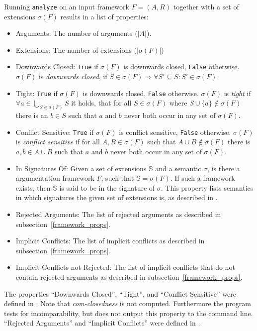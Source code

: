 \documentclass{scrartcl}
\begin{document}
Running \texttt{analyze} on an input framework $F=(A,R)$ together with a set of
extensions $\sigma(F)$ results in a list of properties:
\begin{itemize}
  \item Arguments: The number of arguments ($|A|$).
  \item Extensions:	The number of extensions ($|\sigma(F)|$)
  \item Downwards Closed:	\texttt{True} if $\sigma(F)$ is downwards closed, \texttt{False} otherwise.
    $\sigma(F)$ is \emph{downwards closed}, if $S \in \sigma(F)\Rightarrow
    \forall S'\subseteq S: S'\in\sigma(F)$.
  \item Tight: \texttt{True} if $\sigma(F)$ is downwards closed, \texttt{False} otherwise.
    $\sigma(F)$ is \emph{tight} if $\forall a\in\bigcup_{S\in\sigma(F)}S$ it holds, that
    for all $S\in\sigma(F)$ where $S\cup\{a\}\notin\sigma(F)$ there is an $b\in S$ such that $a$ and $b$
    never both occur in any set of $\sigma(F)$.
  \item Conflict Sensitive: \texttt{True} if $\sigma(F)$ is conflict sensitive, \texttt{False} otherwise.
    $\sigma(F)$ is \emph{conflict sensitive} if for all $A, B\in\sigma(F)$ such that $A\cup B\notin\sigma(F)$
    there is $a, b\in A\cup B$ such that $a$ and $b$ never both occur in any set of $\sigma(F)$.
  \item In Signatures Of: Given a set of extensions $\mathbb{S}$ and a semantic $\sigma$, is there a
    argumentation framework $F$, such that $\mathbb{S} = \sigma(F)$. If such a framework exists,
    then $\mathbb{S}$ is said to be in the signature of $\sigma$. This property lists semantics in which signatures
    the given set of extensions is, as described in \cite{dunne2015characteristics}.
  \item Rejected Arguments: The list of rejected arguments as described in subsection~\ref{framework_props}.
  \item Implicit Conflicts: The list of implicit conflicts as described in subsection~\ref{framework_props}.
  \item Implicit Conflicts not Rejected: The list of implicit conflicts that do not contain rejected arguments
    as described in subsection~\ref{framework_props}.
\end{itemize}

The properties ``Downwards Closed'', ``Tight'', and ``Conflict Sensitive'' were defined
in \cite{dunne2015characteristics}. Note that \emph{com-closedness} is not computed. Furthermore
the program tests for incomparability, but does not output this property to the command line.
``Rejected Arguments'' and ``Implicit Conflicts'' were defined in \cite{linsbichler2015hidden}.
\end{document}
